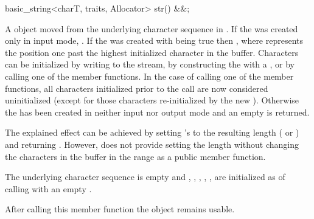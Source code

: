\documentclass[ebook,11pt,article]{memoir}
\begin{document}
\begin{insrt}
\begin{itemdecl}
basic_string<charT, traits, Allocator> str() &&;
\end{itemdecl}
\begin{itemdescr}

\pnum
\returns A  object moved from 
the  underlying character sequence
in . 
If the  was created only in input mode, 
. 
If the  was created with  being true 
then , 
where  represents the position one past the highest initialized character in the buffer. 
Characters can be initialized by writing to the stream, 
by constructing the  with a , 
or by calling one of the  member functions. 
In the case of calling one of the  member functions, 
all characters initialized prior to the call are now considered uninitialized 
(except for those characters re-initialized by the new ). 
Otherwise the  has been created in neither input nor output mode 
and an empty  is returned. 

\pnum
\begin{note}
The explained effect can be achieved by setting 's  to the resulting length ( or ) and returning . However,  does not provide setting the length without changing the characters in the buffer in the range \tcode{[buf.data()+buf.size(), buf.data()+buf.capacity())} as a public member function.
\end{note}

\pnum
\ensures The underlying character sequence  is empty and , , , , ,  are initialized as of calling  with an empty .

\pnum
\begin{note}
After calling this member function the  object remains usable.
\end{note}
\end{itemdescr}


\end{insrt}
\end{document}
